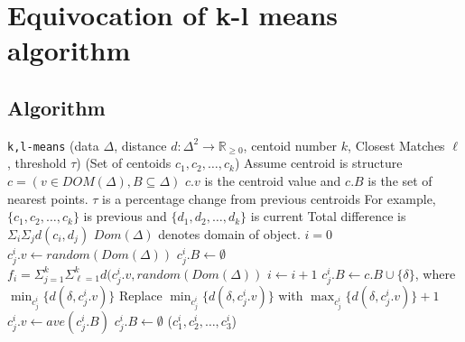\documentclass{article}
\begin{document}
\section*{Equivocation of k-l means algorithm}
\subsection*{Algorithm}
\begin{center}
\begin{algorithmic}[1]\label{k,l-means}
 \texttt{k,l-means}
 (\textsf{data} $\Delta$, distance $d:\Delta^2\rightarrow \mathbb{R}_{\geq 0}$, \textsf{centoid number} $k$, \textsf{Closest Matches} $\ell$, \textsf{threshold} $\tau$)
 (\textsf{Set of centoids} $c_1, c_2, \ldots, c_k$)
\State Assume centroid is structure $c = (v \in DOM(\Delta), B\subseteq \Delta)$
\State  $c.v$ is the centroid value and $c.B$ is the set of nearest points.
\State $\tau$ is a percentage change from previous centroids
\State For example, $\{c_1, c_2, \ldots, c_k\}$ is previous and $\{d_1, d_2, \ldots, d_k\}$ is current
\State Total difference is $\Sigma_i \Sigma_j d(c_i, d_j)$
\State $Dom(\Delta)$ denotes domain of object.
\State $i = 0$
\State $c_j^i.v \gets  random(Dom(\Delta))$
\State $c_j^i.B \gets \emptyset$
\EndFor
\State $f_i = \Sigma_{j=1}^k\Sigma_{\ell = 1}^k d(c_j^i.v, random(Dom(\Delta))$
\Repeat
\color{blue}
\State $i \gets i + 1$
\For {$\delta \in \Delta$}
\State $c_j^i.B \gets c.B \cup \{\delta\}$, where $\min_{c_j^i}\{d(\delta, c_j^i.v)\}$
\State {}
\State Replace $\min_{c_j^i}\{d(\delta, c_j^i.v)\} $ with $ \max_{c_j^i}\{d(\delta, c_j^i.v)\}+1$
\State {}
\EndFor
\EndFor
{}
\State $c_j^i.v \gets ave(c_j^i.B)$
\State $c_j^i.B \gets \emptyset$
\EndFor
\color{black}
 ($c_1^i, c_2^i, \ldots, c_3^i$) 
\end{algorithmic}
\end{center}
\end{document}
